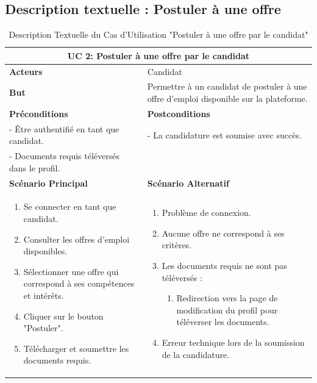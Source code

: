 \subsection{Description textuelle : Postuler à une offre}

\begin{minipage}{\textwidth}
    \begin{table}[H]
    \centering
    \caption{Description Textuelle du Cas d'Utilisation "Postuler à une offre par le candidat"}
    \begin{tabular}{| m{8cm} | m{8cm} |}
    \hline
    \multicolumn{2}{|c|}{\textbf{UC 2:} Postuler à une offre par le candidat} \\ \hline
    \textbf{Acteurs} & Candidat \\ \hline
    \textbf{But} & Permettre à un candidat de postuler à une offre d'emploi disponible sur la plateforme. \\ \hline
    \textbf{Préconditions} & \textbf{Postconditions} \\ \hline
    - Être authentifié en tant que candidat. & - La candidature est soumise avec succès. \\ 
    - Documents requis téléversés dans le profil. & \\ \hline
    \textbf{Scénario Principal} & \textbf{Scénario Alternatif} \\ \hline
    \begin{enumerate}
        \item Se connecter en tant que candidat.
        \item Consulter les offres d'emploi disponibles.
        \item Sélectionner une offre qui correspond à ses compétences et intérêts.
        \item Cliquer sur le bouton "Postuler".
        \item Télécharger et soumettre les documents requis.
    \end{enumerate} & 
    \begin{enumerate}
        \item Problème de connexion.
        \item Aucune offre ne correspond à ses critères.
        \item Les documents requis ne sont pas téléversés :
            \begin{enumerate}
                \item Redirection vers la page de modification du profil pour téléverser les documents.
            \end{enumerate}
        \item Erreur technique lors de la soumission de la candidature.
    \end{enumerate} \\ \hline
    \end{tabular}
    \label{tab:UCPostuler_Offre}
    \end{table}
\end{minipage}

